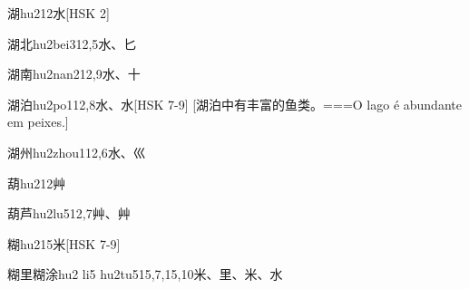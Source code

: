 \begin{EntryWithPhonetic}{湖}{hu2}{12}{⽔}[HSK 2]
\end{EntryWithPhonetic}

\begin{EntryWithPhonetic}{湖北}{hu2bei3}{12,5}{⽔、⼔}
\end{EntryWithPhonetic}

\begin{EntryWithPhonetic}{湖南}{hu2nan2}{12,9}{⽔、⼗}
\end{EntryWithPhonetic}

\begin{EntryWithPhonetic}{湖泊}{hu2po1}{12,8}{⽔、⽔}[HSK 7-9]
  [湖泊中有丰富的鱼类。===O lago é abundante em peixes.]
\end{EntryWithPhonetic}

\begin{EntryWithPhonetic}{湖州}{hu2zhou1}{12,6}{⽔、⼮}
\end{EntryWithPhonetic}

\begin{EntryWithPhonetic}{葫}{hu2}{12}{⾋}
\end{EntryWithPhonetic}

\begin{EntryWithPhonetic}{葫芦}{hu2lu5}{12,7}{⾋、⾋}
\end{EntryWithPhonetic}

\begin{EntryWithPhonetic}{糊}{hu2}{15}{⽶}[HSK 7-9]
\end{EntryWithPhonetic}

\begin{EntryWithPhonetic}{糊里糊涂}{hu2 li5 hu2tu5}{15,7,15,10}{⽶、⾥、⽶、⽔}
\end{EntryWithPhonetic}

